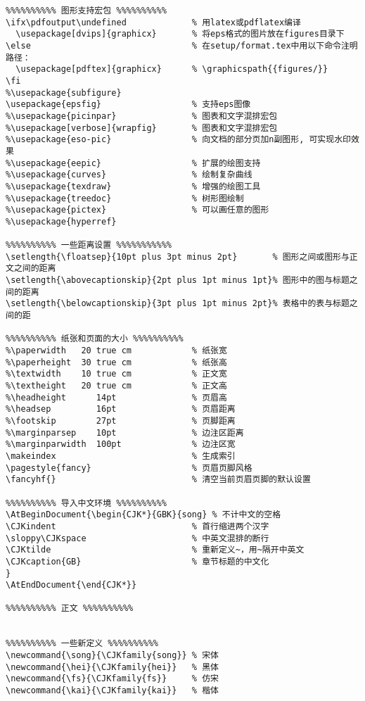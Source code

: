 \begin{verbatim}
%%%%%%%%%% 图形支持宏包 %%%%%%%%%%
\ifx\pdfoutput\undefined             % 用latex或pdflatex编译
  \usepackage[dvips]{graphicx}       % 将eps格式的图片放在figures目录下
\else                                % 在setup/format.tex中用以下命令注明路径：
  \usepackage[pdftex]{graphicx}      % \graphicspath{{figures/}}
\fi
%\usepackage{subfigure}
\usepackage{epsfig}                  % 支持eps图像
%\usepackage{picinpar}               % 图表和文字混排宏包
%\usepackage[verbose]{wrapfig}       % 图表和文字混排宏包
%\usepackage{eso-pic}                % 向文档的部分页加n副图形, 可实现水印效果
%\usepackage{eepic}                  % 扩展的绘图支持
%\usepackage{curves}                 % 绘制复杂曲线
%\usepackage{texdraw}                % 增强的绘图工具
%\usepackage{treedoc}                % 树形图绘制
%\usepackage{pictex}                 % 可以画任意的图形
%\usepackage{hyperref}

%%%%%%%%%% 一些距离设置 %%%%%%%%%%%
\setlength{\floatsep}{10pt plus 3pt minus 2pt}       % 图形之间或图形与正文之间的距离
\setlength{\abovecaptionskip}{2pt plus 1pt minus 1pt}% 图形中的图与标题之间的距离
\setlength{\belowcaptionskip}{3pt plus 1pt minus 2pt}% 表格中的表与标题之间的距

%%%%%%%%%% 纸张和页面的大小 %%%%%%%%%%
%\paperwidth   20 true cm            % 纸张宽
%\paperheight  30 true cm            % 纸张高
%\textwidth    10 true cm            % 正文宽
%\textheight   20 true cm            % 正文高
%\headheight      14pt               % 页眉高
%\headsep         16pt               % 页眉距离
%\footskip        27pt               % 页脚距离
%\marginparsep    10pt               % 边注区距离
%\marginparwidth  100pt              % 边注区宽
\makeindex                           % 生成索引
\pagestyle{fancy}                    % 页眉页脚风格
\fancyhf{}                           % 清空当前页眉页脚的默认设置

%%%%%%%%%% 导入中文环境 %%%%%%%%%%
\AtBeginDocument{\begin{CJK*}{GBK}{song} % 不计中文的空格
\CJKindent                           % 首行缩进两个汉字
\sloppy\CJKspace                     % 中英文混排的断行
\CJKtilde                            % 重新定义~，用~隔开中英文
\CJKcaption{GB}                      % 章节标题的中文化
}
\AtEndDocument{\end{CJK*}}

%%%%%%%%%% 正文 %%%%%%%%%%


%%%%%%%%%% 一些新定义 %%%%%%%%%%
\newcommand{\song}{\CJKfamily{song}} % 宋体
\newcommand{\hei}{\CJKfamily{hei}}   % 黑体
\newcommand{\fs}{\CJKfamily{fs}}     % 仿宋
\newcommand{\kai}{\CJKfamily{kai}}   % 楷体


\end{verbatim}
